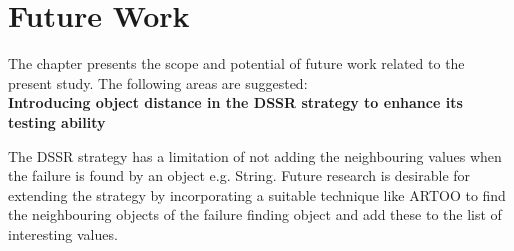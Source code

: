 
\chapter{Future Work}
\label{chap:futureWork}
The chapter presents the scope and potential of future work related to the present study. The following areas are suggested:\\


	
\textbf{Introducing object distance in the DSSR strategy to enhance its testing ability}

The DSSR strategy has a limitation of not adding the neighbouring values when the failure is found by an object e.g. String. Future research is desirable for extending the strategy by incorporating a suitable technique like ARTOO to find the neighbouring objects of the failure finding object and add these to the list of interesting values.  



